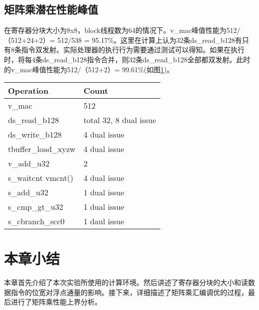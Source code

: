 \subsection{矩阵乘潜在性能峰值}
在寄存器分块大小为8x8，block线程数为64的情况下。v\_mac峰值性能为512/（512+24+2）= 512/538 = 95.17\%。这里在计算上认为32条ds\_read\_b128有只有8条指令双发射。实际处理器的执行行为需要通过测试可以得知。如果在执行时，将每4条ds\_read\_b128指令合并，则32条ds\_read\_b128全部都双发射。此时的v\_mac峰值性能为512/（512+2）= 99.61\%(如图\ref{tab:fijiFFMA})。

\begin{table}[htbp]
	\label{tab:fijiFFMA}
	\begin{center}
		\begin{tabular}{ | l | p{4cm} |}
			\hline
			Operation & Count \\ \hline
			v\_mac & 512  \\ \hline
			ds\_read\_b128 & total 32, 8 dual issue \\ \hline
			ds\_write\_b128 & 4 dual issue \\ \hline
			tbuffer\_load\_xyzw & 4 dual issue \\ \hline
			v\_add\_u32 & 2 \\ \hline
			s\_waitcnt vmcnt() & 4 dual issue \\ \hline
			s\_add\_u32 & 1 dual issue \\ \hline
			s\_cmp\_gt\_u32 & 1 dual issue \\ \hline
			s\_cbranch\_scc0 & 1 daul issue \\
			\hline
		\end{tabular}
	\end{center}	
\end{table}


\section{本章小结}
本章首先介绍了本次实验所使用的计算环境。然后讲述了寄存器分块的大小和读数据指令的位宽对浮点通量的影响。接下来，详细描述了矩阵乘汇编调优的过程，最后进行了矩阵乘性能上界分析。


